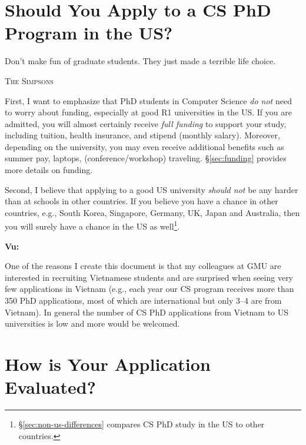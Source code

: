 \documentclass[oneside,11pt]{memoir}
\newenvironment{commentbox}[1][]{
\small
    \begin{mybox}
    {\small \textbf{#1}}
 }{
   \end{mybox}
}
\begin{document}
\mainmatter
\chapter{Should You Apply to a CS PhD Program in the US?}\label{sec:should}

\epigraph{\vspace{-0.2in} Don't make fun of graduate students. They just made a terrible life choice.}{\textsc{The Simpsons}}

First, I want to emphasize that PhD students in Computer Science \emph{do not} need to worry about funding, especially at good R1
universities in the US. If you are admitted, you will almost certainly
receive \emph{full funding} to support your study, including tuition,
health insurance, and stipend (monthly salary). Moreover, depending on the university,
you may even receive additional benefits such as summer pay, laptops, (conference/workshop) traveling. \S\ref{sec:funding} provides more details on funding.

Second, I believe that applying to a good US university \emph{should not} be any
harder than at schools in other countries. If you believe you have a chance in other countries, e.g., South Korea, Singapore, Germany, UK, Japan and Australia, then you will surely have a chance in the US as well\footnote{\S\ref{sec:non-us-differences} compares CS PhD study in the US to other countries.}.

\begin{commentbox}[Vu:]
One of the reasons I create this document is that my colleagues at GMU are interested in recruiting Vietnamese students and are surprised when seeing very few applications in Vietnam (e.g., each year our CS program receives more than 350 PhD applications, most of which are international but only 3--4 are from Vietnam). In general the number of CS PhD applications from Vietnam to US universities is low and more would be welcomed. 
\end{commentbox}



\chapter{How is Your Application Evaluated?}\label{sec:evalapps}
\end{document}
